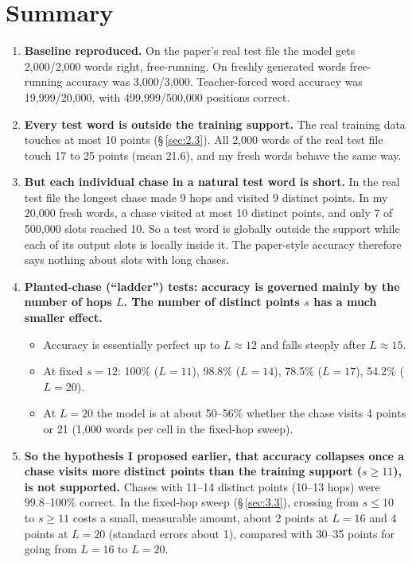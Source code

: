 \documentclass[paper=a4,fontsize=11pt,DIV=11,parskip=half,headings=small,numbers=noendperiod]{scrartcl}
\DeclareRobustCommand{\lead}[1]{\textsf{\bfseries\color{accent}#1}}
\newcommand{\tagpill}[2]{\tcbox[on line,colback=#1,colframe=#1,boxrule=0pt,arc=1.6pt,left=2.4pt,right=2.4pt,top=0.9pt,bottom=0.9pt,boxsep=0pt,tcbox raise base,fontupper={\sffamily\bfseries\fontsize{6.8}{7}\selectfont\color{white}}]{#2}}
\DeclareRobustCommand{\tagupd}{\texorpdfstring{\tagpill{updcol}{UPDATED}}{[UPDATED]}}
\begin{document}
\section{Summary \tagupd{}}\label{sec:1}
\begin{enumerate}
\item \lead{Baseline reproduced.} On the paper’s real test file the model gets 2,000/2,000 words right,
  free-running. On freshly generated words free-running accuracy was 3,000/3,000. Teacher-forced word accuracy
  was 19,999/20,000, with 499,999/500,000 positions correct.
\item \lead{Every test word is outside the training support.} The real training data touches at most 10 points
  (\S\,\ref{sec:2.3}). All 2,000 words of the real test file touch 17 to 25 points (mean 21.6), and my fresh
  words behave the same way.
\item \lead{But each individual chase in a natural test word is short.} In the real test file the longest chase
  made 9 hops and visited 9 distinct points. In my 20,000 fresh words, a chase visited at most 10 distinct
  points, and only 7 of 500,000 slots reached 10. So a test word is globally outside the support while each of
  its output slots is locally inside it. The paper-style accuracy therefore says nothing about slots with long
  chases.
\item \lead{Planted-chase (“ladder”) tests: accuracy is governed mainly by the number of hops $L$. The number of
  distinct points $s$ has a much smaller effect.}
\begin{itemize}
\item Accuracy is essentially perfect up to $L\approx 12$ and falls steeply after $L\approx 15$.
\item At fixed $s=12$: 100\% ($L=11$), 98.8\% ($L=14$), 78.5\% ($L=17$), 54.2\% ($L=20$).
\item At $L=20$ the model is at about 50–56\% whether the chase visits 4 points or 21 (1,000 words per cell in
  the fixed-hop sweep).
\end{itemize}
\item \lead{So the hypothesis I proposed earlier, that accuracy collapses once a chase visits more distinct
  points than the training support ($s\ge11$), is not supported.} Chases with 11–14 distinct points (10–13 hops)
  were 99.8–100\% correct. In the fixed-hop sweep (\S\,\ref{sec:3.3}), crossing from $s\le10$ to $s\ge11$ costs
  a small, measurable amount, about 2 points at $L=16$ and 4 points at $L=20$ (standard errors about 1),
  compared with 30–35 points for going from $L=16$ to $L=20$.

\end{enumerate}
\end{document}
